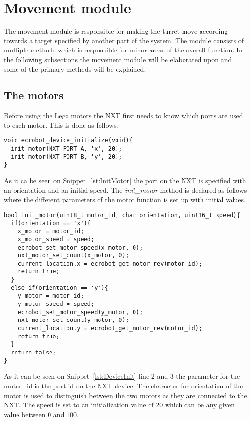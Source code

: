 \section{Movement module}
The movement module is responsible for making the turret move according towards a target specified by another part of the system.
The module consists of multiple methods which is responsible for minor areas of the overall function. 
In the following subsections the movement module will be elaborated upon and some of the primary methods will be explained. 

\subsection{The motors}
Before using the Lego motors the NXT first needs to know which ports are used to each motor. 
This is done as follows:
\begin{lstlisting}[language=CSharp, label={lst:DeviceInit},caption={ecrobot\_device\_initialize method from movement.c}]
void ecrobot_device_initialize(void){
  init_motor(NXT_PORT_A, 'x', 20);
  init_motor(NXT_PORT_B, 'y', 20);
}
\end{lstlisting}
As it ca be seen on Snippet~\ref{lst:InitMotor} the port on the NXT is specified with an orientation and an initial speed.
The \textit{init\_motor} method is declared as follows where the different parameters of the motor function is set up with initial values.

\begin{lstlisting}[language=CSharp,label={lst:InitMotor},caption={init\_motor method from movement.c}]
bool init_motor(uint8_t motor_id, char orientation, uint16_t speed){
  if(orientation == 'x'){
    x_motor = motor_id;
    x_motor_speed = speed;
    ecrobot_set_motor_speed(x_motor, 0);
    nxt_motor_set_count(x_motor, 0);
    current_location.x = ecrobot_get_motor_rev(motor_id);
    return true;
  }
  else if(orientation == 'y'){
    y_motor = motor_id;
    y_motor_speed = speed;
    ecrobot_set_motor_speed(y_motor, 0);
    nxt_motor_set_count(y_motor, 0);
    current_location.y = ecrobot_get_motor_rev(motor_id);
    return true;
  }
  return false;
}
\end{lstlisting}
As it can be seen on Snippet~\ref{lst:DeviceInit} line 2 and 3 the parameter for the motor\_id is the port id on the NXT device. 
The character for orientation of the motor is used to distinguish between the two motors as they are connected to the NXT.
The speed is set to an initialization value of $20$ which can be any given value between $0$ and $100$.

